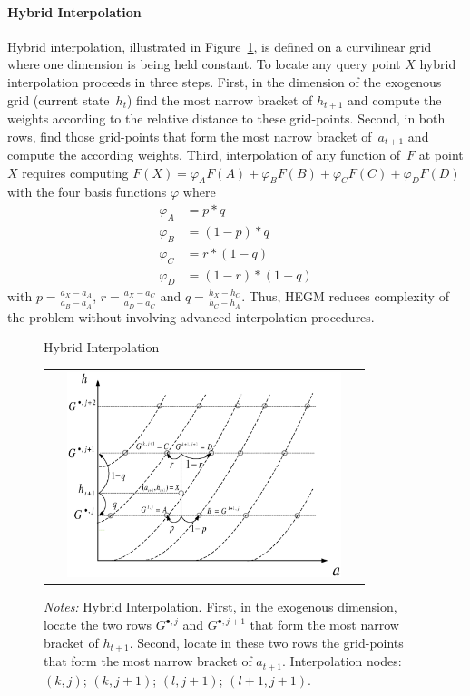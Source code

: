 \documentclass[a4paper,12pt]{article}
\begin{document}
\paragraph{Hybrid Interpolation}

Hybrid interpolation, illustrated in Figure~\ref{Hybrid interpolation}, is defined on a curvilinear grid where one dimension is being held constant. To locate any query point $X$ hybrid interpolation proceeds in three steps. First, in the dimension of the exogenous grid (current state~$h_{t}$) find the most narrow bracket of $h_{t+1}$ and compute the weights according to the relative distance to these grid-points. Second, in both rows, find those grid-points that form the most narrow bracket of~$a_{t+1}$ and compute the according weights. Third, interpolation of any function of~$F$ at point $X$ requires computing $F\left(X\right) = \varphi_{A} F(A) + \varphi_{B} F(B) + \varphi_{C} F(C) + \varphi_{D} F(D)$ with the four basis functions $\varphi$ where
\begin{align*}
	\varphi_{A}  &  = p \ast q  \\
	\varphi_{B}  &  = \left(1 - p\right) \ast q  \\
	\varphi_{C}  &  = r \ast \left(1 - q\right)  \\
	\varphi_{D}  &  = \left(1 - r\right) \ast \left(1 - q\right)
\end{align*}
with $p=\frac{a_{X} - a_{A}} {a_{B} - a_{A}}$, $r = \frac{a_{X} - a_{C}} {a_{D} - a_{C}}$ and $q = \frac{h_{X} - h_{C}} {h_{C} - h_{A}}$. Thus, HEGM reduces complexity of the problem without involving advanced interpolation procedures.

\begin{figure}[htbp]
	\caption{Hybrid Interpolation}
	\label{Hybrid interpolation}
	\centering
	\begin{tabular}{c}
	\includegraphics[height=6.0cm, width=9.0cm]{Abbildungen/hybrid_3.eps}  \\
	\end{tabular}
	\caption*{\footnotesize{\emph{Notes:} Hybrid Interpolation. First, in the exogenous dimension, locate the two rows $G^{\bullet,j}$ and $G^{\bullet,j+1}$ that form the most narrow bracket of $h_{t+1}$. Second, locate in these two rows the grid-points that form the most narrow bracket of $a_{t+1}$. Interpolation nodes: $(k,j)$; $(k,j+1)$; $(l,j+1)$; $(l+1,j+1)$.}}
\end{figure}
\end{document}
